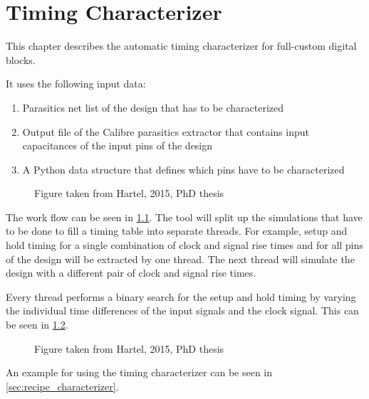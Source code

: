 \chapter{Timing Characterizer}
\label{chap:timing_characterizer}

This chapter describes the automatic timing characterizer for full-custom
digital blocks.

It uses the following input data:
\begin{enumerate}
	\item Parasitics net list of the design that has to be characterized
	\item Output file of the Calibre parasitics extractor that contains input
		capacitances of the input pins of the design
	\item A Python data structure that defines which pins have to be
		characterized
\end{enumerate}

\begin{figure}
	\centering
	\caption{Figure taken from Hartel, 2015, PhD thesis}
	\label{fig:workflow_characterizer}
\end{figure}

The work flow can be seen in \cref{fig:workflow_characterizer}.
The tool will split up the simulations that have to be done to fill a timing
table into separate threads. For example, setup and hold timing for a single
combination of clock and signal rise times and for all pins of the design will
be extracted by one thread. The next thread will simulate the design with a
different pair of clock and signal rise times.

Every thread performs a binary search for the setup and hold timing by varying
the individual time differences of the input signals and the clock signal. This
can be seen in \cref{fig:binary_search_characterizer}.

\begin{figure}
	\centering
	
	\caption{Figure taken from Hartel, 2015, PhD thesis}
	\label{fig:binary_search_characterizer}
\end{figure}

An example  for using the timing characterizer can be seen in
\cref{sec:recipe_characterizer}.
